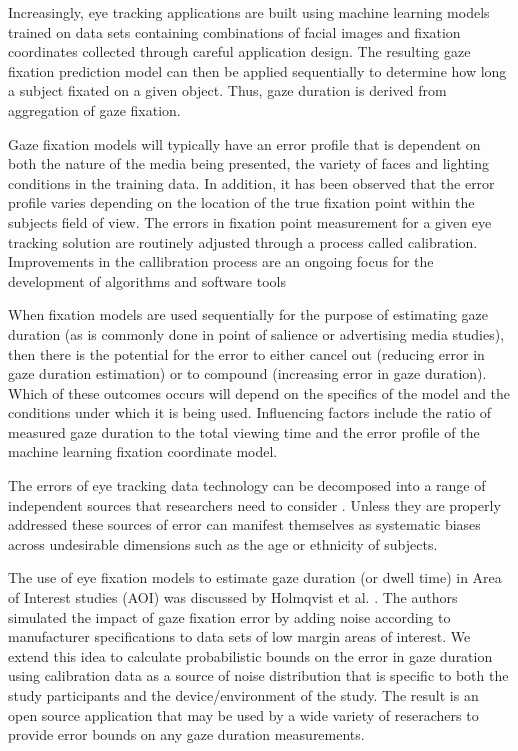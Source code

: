 \documentclass[12pt,a4paper]{article}
\numberwithin{equation}{section}
\begin{document}
Increasingly, eye tracking applications are built using machine learning models trained on 
data sets containing combinations of facial images and fixation coordinates collected 
through careful application design. The resulting gaze fixation prediction model can 
then be applied sequentially to determine how long a subject fixated on a given object.
Thus, gaze duration is derived from aggregation of gaze fixation.

Gaze fixation models will typically have an error profile that is dependent on both 
the nature of the media being presented, the variety of faces and lighting conditions 
in the training data. In addition, it has been observed that the error profile varies 
depending on the location of the true fixation point within the subjects field of view.
The errors in fixation point measurement for a given eye tracking solution are routinely
adjusted through a process called calibration. Improvements in the callibration process
are an ongoing focus for the development of algorithms\cite{Zhang2014,Hassoumi2019} 
and software tools\cite{ETCAL2018} 

When fixation models are used sequentially for the purpose of estimating gaze duration
(as is commonly done in point of salience or advertising media studies), 
then there is the potential for the error
to either cancel out (reducing error in gaze duration estimation) or to compound
(increasing error in gaze duration). Which of these outcomes occurs will depend on the
specifics of the model and the conditions under which it is being used.
Influencing factors include the ratio of measured gaze duration to the total viewing time
and the error profile of the machine learning fixation coordinate model.

The errors of eye tracking data technology can be decomposed into a range of
independent sources that researchers need to consider \cite{Holmqvist2012}.
Unless they are properly addressed these sources of error can manifest themselves
as systematic biases across undesirable dimensions such as the age\cite{Dalrymple2018}
or ethnicity of subjects\cite{Blignaut2013}. 

The use of eye fixation models to estimate gaze duration (or dwell time) in Area of
Interest studies (AOI) was discussed by Holmqvist et al. \cite{Holmqvist2012}. The
authors simulated the impact of gaze fixation error by adding noise according to
manufacturer specifications to data sets of low margin areas of interest. We extend 
this idea to calculate probabilistic bounds on the error in gaze duration using
calibration data as a source of noise distribution that is specific to both the
study participants and the device/environment of the study. The result is an open
source application that may be used by a wide variety of reserachers to provide
error bounds on any gaze duration measurements.
\end{document}
